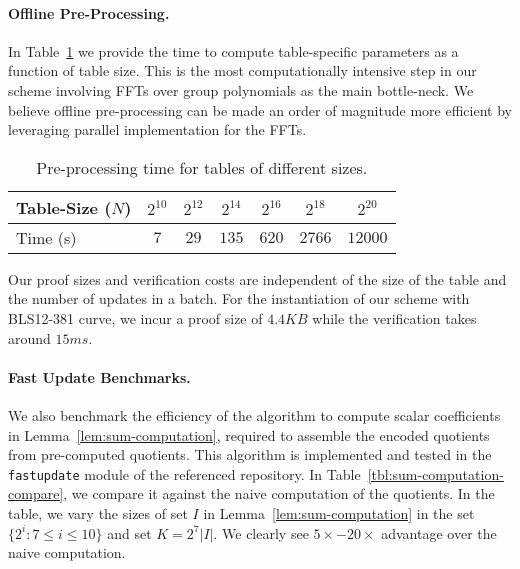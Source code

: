 \paragraph{\bf Offline Pre-Processing.} In Table~\ref{tbl:offline-proving-time} we provide the time to compute
table-specific parameters as a function of table size. This is the most computationally intensive step in our
scheme involving FFTs over group polynomials as the main bottle-neck. We believe offline pre-processing can be
made an order of magnitude more efficient by leveraging parallel implementation for the FFTs.

\begin{table}[htbp]
	\centering
    \begin{tabular}{|l|c|c|c|c|c|c|}
        \hline
        \cellcolor{lightgray} Table-Size ($N$) & $2^{10}$ & $2^{12}$ & $2^{14}$ & $2^{16}$ & $2^{18}$ & $2^{20}$ \\ \hline
        \cellcolor{lightgray} Time (s) & $7$ & $29$ & $135$ & $620$ & $2766$ & $12000$ \\ \hline
    \end{tabular}
    \caption{Pre-processing time for tables of different sizes.}
    \label{tbl:offline-proving-time}
\end{table}


 Our proof sizes and verification costs are independent of the
size of the table and the number of updates in a batch. For the instantiation of our scheme with BLS12-381 curve,
we incur a proof size of $4.4KB$ while the verification takes around $15ms$.

\paragraph{\bf Fast Update Benchmarks.} We also benchmark the efficiency of the algorithm to compute
 scalar coefficients in Lemma~\ref{lem:sum-computation}, required to assemble the encoded quotients from pre-computed quotients.
This algorithm is implemented and tested in the {\tt fastupdate} module of the referenced repository.
In Table~\ref{tbl:sum-computation-compare}, we compare it against the naive computation of the quotients.
In the table, we vary the sizes of set $I$ in Lemma~\ref{lem:sum-computation} in the set $\{2^i:7\leq i\leq 10\}$
and set $K=2^7|I|$. %
We clearly see $5\times-20\times$ advantage over the naive computation.

